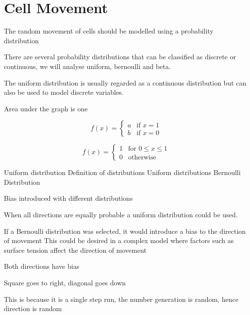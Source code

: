 \section{Cell Movement}


The random movement of cells should be modelled using a probability distribution

There are several probability distributions that can be classified as discrete or continuous, we will analyse uniform, bernoulli and beta.

The uniform distribution is usually regarded as a continuous distribution but can also be used to model discrete variables. 

Area under the graph is one

\[ f(x) =\begin{cases}a & \text{if } x = 1\\b & \text{if } x = 0\end{cases}\]

\[ f(x) =\begin{cases}1 & \text{for } 0  \leq x  \leq  1\\0 & \text{otherwise}\end{cases}\]

Uniform distribution
Definition of distributions
Uniform distributions
Bernoulli Distribution

Bias introduced with different distributions


When all directions are equally probable a uniform distribution could be used.

If a Bernoulli distribution was selected, it would introduce a bias to the direction of movement
This could be desired in a complex model where factors such as surface tension affect the direction of movement





\clearpage

Both directions have bias

Square goes to right, diagonal goes down 

This is because it is a single step run, the number generation is random, hence direction is random

